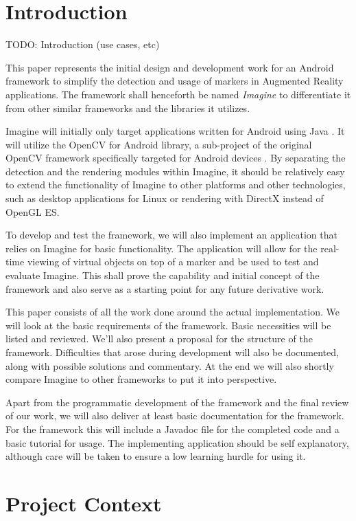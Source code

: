 \section{Introduction}

TODO: Introduction (use cases, etc)

This paper represents the initial design and development work for an Android framework to simplify the detection and usage of markers in Augmented Reality applications.
The framework shall henceforth be named \textit{Imagine} to differentiate it from other similar frameworks and the libraries it utilizes.

Imagine will initially only target applications written for Android using Java \cite{android}.
It will utilize the OpenCV for Android library, a sub-project of the original OpenCV framework specifically targeted for Android devices \cite{opencvandroid}.
By separating the detection and the rendering modules within Imagine, it should be relatively easy to extend the functionality of Imagine to other platforms and other technologies, such as desktop applications for Linux or rendering with DirectX instead of OpenGL ES.

To develop and test the framework, we will also implement an application that relies on Imagine for basic functionality.
The application will allow for the real-time viewing of virtual objects on top of a marker and be used to test and evaluate Imagine.
This shall prove the capability and initial concept of the framework and also serve as a starting point for any future derivative work.

This paper consists of all the work done around the actual implementation.
We will look at the basic requirements of the framework.
Basic necessities will be listed and reviewed.
We'll also present a proposal for the structure of the framework.
Difficulties that arose during development will also be documented, along with possible solutions and commentary.
At the end we will also shortly compare Imagine to other frameworks to put it into perspective.

Apart from the programmatic development of the framework and the final review of our work, we will also deliver at least basic documentation for the framework.
For the framework this will include a Javadoc\cite{docjava} file for the completed code and a basic tutorial for usage.
The implementing application should be self explanatory, although care will be taken to ensure a low learning hurdle for using it.

\section{Project Context}

